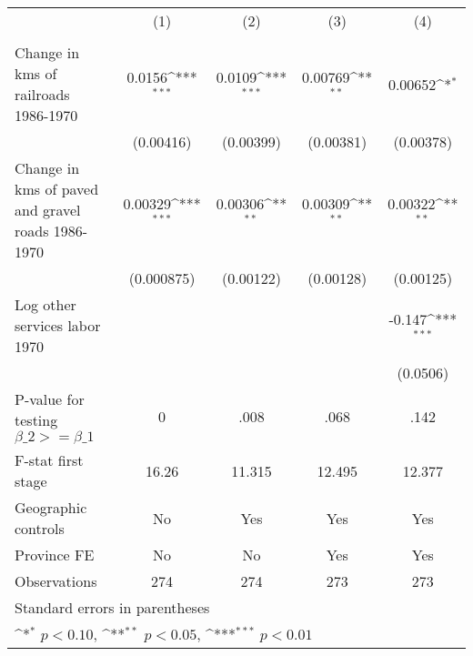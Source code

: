 {
\def\sym#1{\ifmmode^{#1}\else\(^{#1}\)\fi}
\begin{tabular}{l*{4}{c}}
\hline\hline
                &\multicolumn{1}{c}{(1)}&\multicolumn{1}{c}{(2)}&\multicolumn{1}{c}{(3)}&\multicolumn{1}{c}{(4)}\\
                &\multicolumn{1}{c}{}&\multicolumn{1}{c}{}&\multicolumn{1}{c}{}&\multicolumn{1}{c}{}\\
\hline
Change in kms of railroads 1986-1970&   0.0156\sym{***}&   0.0109\sym{***}&  0.00769\sym{**} &  0.00652\sym{*}  \\
                &(0.00416)         &(0.00399)         &(0.00381)         &(0.00378)         \\
[1em]
Change in kms of paved and gravel roads 1986-1970&  0.00329\sym{***}&  0.00306\sym{**} &  0.00309\sym{**} &  0.00322\sym{**} \\
                &(0.000875)         &(0.00122)         &(0.00128)         &(0.00125)         \\
[1em]
Log other services labor 1970&                  &                  &                  &   -0.147\sym{***}\\
                &                  &                  &                  & (0.0506)         \\
\hline
P-value for testing $\beta\_{2} >= \beta\_{1}$&        0         &     .008         &     .068         &     .142         \\
F-stat first stage&    16.26         &   11.315         &   12.495         &   12.377         \\
Geographic controls&       No         &      Yes         &      Yes         &      Yes         \\
Province FE     &       No         &       No         &      Yes         &      Yes         \\
Observations    &      274         &      274         &      273         &      273         \\
\hline\hline
\multicolumn{5}{l}{\footnotesize Standard errors in parentheses}\\
\multicolumn{5}{l}{\footnotesize \sym{*} \(p<0.10\), \sym{**} \(p<0.05\), \sym{***} \(p<0.01\)}\\
\end{tabular}
}
